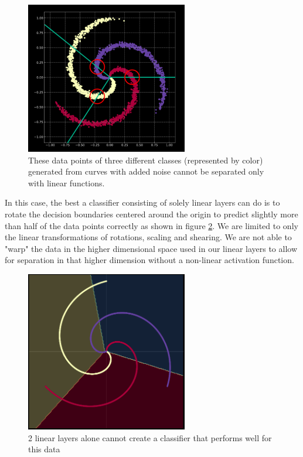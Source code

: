 \begin{figure}[ht]
    \centering
    \includegraphics[width=200pt]{labs/02/images/spiral2.png}
    \caption{These data points of three different classes (represented by color) generated from curves with added noise cannot be separated only with linear functions.}
    \label{fig:spiral_with_noise}
\end{figure}

In this case, the best a classifier consisting of solely linear layers can do is to rotate the decision boundaries centered around the origin to predict slightly more than half of the data points correctly as shown in figure \ref{fig:spiral_linear_classifier}. We are limited to only the linear transformations of rotations, scaling and shearing. We are not able to "warp" the data in the higher dimensional space used in our linear layers to allow for separation in that higher dimension without a non-linear activation function.

\begin{figure}[ht]
    \centering
    \includegraphics[width=200pt]{labs/02/images/linear.png}
    \caption{2 linear layers alone cannot create a classifier that performs well for this data}
    \label{fig:spiral_linear_classifier}
\end{figure}

